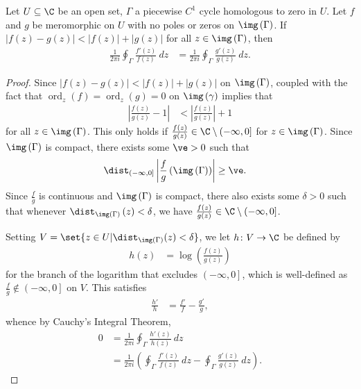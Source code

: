\documentclass[10pt]{mypackage}
\begin{document}
\begin{theorem}
  Let $U\subseteq \C$ be an open set, $\Gamma$ a piecewise $C^{1}$  cycle homologous to zero in $U$. Let $f$ and $g$ be meromorphic on $U$ with no poles or zeros on $\img\left( \Gamma \right)$. If $\left\vert f(z) - g(z) \right\vert < \left\vert f(z) \right\vert + \left\vert g(z) \right\vert$ for all $z\in \img\left( \Gamma \right)$, then
  \begin{align*}
    \frac{1}{2\pi i}\oint_{\Gamma}^{} \frac{f'(z)}{f(z)}\:dz &= \frac{1}{2\pi i}\oint_{\Gamma}^{} \frac{g'(z)}{g(z)}\:dz.
  \end{align*}
\end{theorem}
\begin{proof}
  Since $\left\vert f(z) - g(z) \right\vert < \left\vert f(z) \right\vert + \left\vert g(z) \right\vert$ on $\img\left( \Gamma \right)$, coupled with the fact that $\operatorname{ord}_{z}(f) = \operatorname{ord}_{z}(g) = 0$ on $\img\left( \gamma \right)$ implies that
  \begin{align*}
    \left\vert \frac{f(z)}{g(z)} - 1 \right\vert &< \left\vert \frac{f(z)}{g(z)} \right\vert + 1
  \end{align*}
  for all $z\in \img\left( \Gamma \right)$. This only holds if $\frac{f(z)}{g(z)} \in \C\setminus \left( -\infty,0 \right]$ for $z\in \img\left( \Gamma \right)$. Since $\img\left( \Gamma \right)$ is compact, there exists some $\ve > 0$ such that
  \begin{align*}
    \dist_{\left( -\infty,0 \right]}\left\vert \frac{f}{g}\left( \img\left( \Gamma \right) \right) \right\vert &\geq \ve.
  \end{align*}
  Since $\frac{f}{g}$ is continuous and $\img\left( \Gamma \right)$ is compact, there also exists some $\delta > 0$ such that whenever $\dist_{\img\left( \Gamma \right)}\left( z \right) < \delta$, we have $\frac{f(z)}{g(z)} \in \C\setminus \left( -\infty,0 \right]$.%

  Setting $V = \set{z\in U | \dist_{\img\left( \Gamma \right)}(z) < \delta}$, we let $h\colon V\rightarrow \C$ be defined by
  \begin{align*}
    h(z) &= \log\left( \frac{f(z)}{g(z)} \right)
  \end{align*}
  for the branch of the logarithm that excludes $\left( -\infty,0 \right]$, which is well-defined as $\frac{f}{g}\notin \left( -\infty,0 \right]$ on $V$. This satisfies
  \begin{align*}
    \frac{h'}{h} &= \frac{f'}{f} - \frac{g'}{g},
  \end{align*}
  whence by Cauchy's Integral Theorem,
  \begin{align*}
    0 &= \frac{1}{2\pi i} \oint_{\Gamma}^{} \frac{h'(z)}{h(z)}\:dz\\
      &= \frac{1}{2\pi i} \left( \oint_{\Gamma}^{} \frac{f'(z)}{f(z)}\:dz - \oint_{\Gamma}^{} \frac{g'(z)}{g(z)}\:dz \right).
  \end{align*}
\end{proof}
\end{document}
